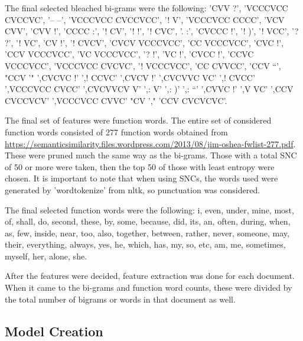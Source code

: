 The final selected bleached bi-grams were the following: 'CVV ?', 'VCCCVCC CVCCVC', '-- --', 'VCCCVCC CVCCVCC', '! V', 'VCCCVCC CCCC', 'VCV CVV', 'CVV !', 'CCCC :', '! CV', '! !', '! CVC', '. :', 'CVCCC !', '! )', '! VCC', '? ?', '! VC', 'CV !', '! CVCV', 'CVCV VCCCVCC', 'CC VCCCVCC', 'CVC !', 'CCV VCCCVCC', 'VC VCCCVCC', '? !', 'VC !', 'CVCC !', 'CCVC VCCCVCC', 'VCCCVCC CVCVC', '! VCCCVCC', 'CC CVVCC', 'CCV ``', "CCV '" ',CVCVC !' ',! CCVC' ',CVCV !' ',CVCVVC VC' ',! CVCC' ',VCCCVCC CVCC' ',CVCVVCV V' ',: V' ',: )' ',: ``' ',CVVC !' ',V VC' ',CCV CVCCVCV' ',VCCCVCC CVVC' "CV '," 'CCV CVCVCVC'.

The final set of features were function words. The entire set of considered function words consisted of 277 function words obtained from \url{https://semanticsimilarity.files.wordpress.com/2013/08/jim-oshea-fwlist-277.pdf}. These were pruned much the same way as the bi-grams. Those with a total SNC of 50 or more were taken, then the top 50 of those with least entropy were chosen. It is important to note that when using SNCs, the words used were generated by 'word\textunderscore tokenize' from nltk, so punctuation was considered.

The final selected function words were the following: i, even, under, mine, most, of, shall, do, second, these, by, some, because, did, its, an, often, during, when, as, few, inside, near, too, also, together, between, rather, never, someone, may, their, everything, always, yes, he, which, has, my, so, etc, am, me, sometimes, myself, her, alone, she.

After the features were decided, feature extraction was done for each document. When it came to the bi-grams and function word counts, these were divided by the total number of bigrams or words in that document as well. 

\subsection{Model Creation}